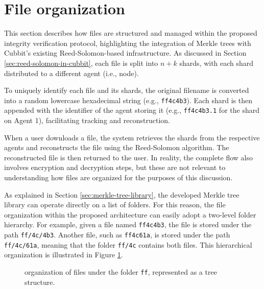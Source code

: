\section{File organization}

This section describes how files are structured and managed within the proposed integrity verification protocol, highlighting the integration of Merkle trees with Cubbit's existing Reed-Solomon-based infrastructure. As discussed in Section \ref{sec:reed-solomon-in-cubbit}, each file is split into $n+k$ shards, with each shard distributed to a different agent (i.e., node).

To uniquely identify each file and its shards, the original filename is converted into a random lowercase hexadecimal string (e.g., \texttt{ff4c4b3}). Each shard is then appended with the identifier of the agent storing it (e.g., \texttt{ff4c4b3.1} for the shard on Agent 1), facilitating tracking and reconstruction.

When a user downloads a file, the system retrieves the shards from the respective agents and reconstructs the file using the Reed-Solomon algorithm. The reconstructed file is then returned to the user. In reality, the complete flow also involves encryption and decryption steps, but these are not relevant to understanding how files are organized for the purposes of this discussion.

As explained in Section \ref{sec:merkle-tree-library}, the developed Merkle tree library can operate directly on a list of folders. For this reason, the file organization within the proposed architecture can easily adopt a two-level folder hierarchy. For example, given a file named \texttt{ff4c4b3}, the file is stored under the path \texttt{ff/4c/4b3}. Another file, such as \texttt{ff4c61a}, is stored under the path \texttt{ff/4c/61a}, meaning that the folder \texttt{ff/4c} contains both files. This hierarchical organization is illustrated in Figure \ref{fig:file-organization-example-in-tree}.  

\begin{figure}[h]
\centering
{}
\caption{organization of files under the folder \texttt{ff}, represented as a tree structure.}
\label{fig:file-organization-example-in-tree}
\end{figure}

